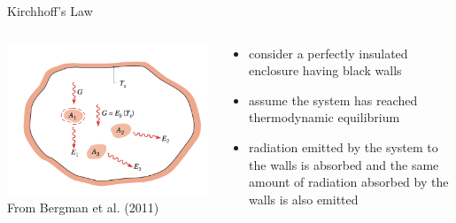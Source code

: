 \begin{frame}{Kirchhoff's Law}
\begin{columns}[T]
    \begin{column}{.4\textwidth}
    \begin{minipage}[c][0.8\textheight][c]{\linewidth}
    \includegraphics[width=1\textwidth]{fig14.png}\\
    \centering \small From Bergman et al. (2011)
    \end{minipage}
    \end{column}
    \begin{column}{.6\textwidth}
    \begin{minipage}[c][0.8\textheight][c]{\linewidth}
   \begin{itemize}
   	\item consider a perfectly insulated enclosure having black walls
   	\item assume the system has reached thermodynamic equilibrium
   	\item radiation emitted by the system to the walls is absorbed and the same amount of radiation absorbed by the walls is also emitted
   \end{itemize}
      \end{minipage}
    \end{column}
  \end{columns} 
\end{frame}

